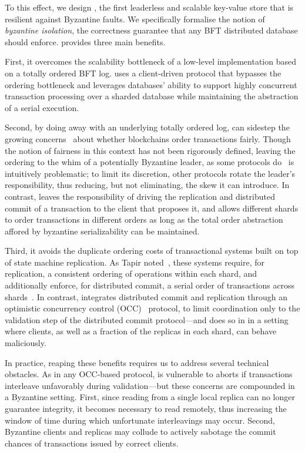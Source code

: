 To this effect, we design \sys{}, the first leaderless and scalable key-value store that is resilient against
Byzantine faults. We specifically formalise the notion of \textit{byzantine isolation}, the correctness
guarantee that any BFT distributed database should enforce.  \sys{} provides three main benefits.

 First, it overcomes the scalability bottleneck of a low-level
implementation based on a totally ordered BFT log. \sys uses a
client-driven protocol that bypasses the ordering bottleneck and
leverages databases' ability to support highly concurrent transaction
processing over a sharded database while maintaining the abstraction
of a serial execution.


Second, by doing away with an underlying totally ordered log, \sys{} can
sidestep the growing concerns~\cite{} about whether blockchains
order transactions fairly. Though the notion of fairness in this
context has not been rigorously defined, leaving the ordering to the
whim of a potentially Byzantine leader, as some protocols do~\cite{}
is intuitively problematic; to limit its discretion, other protocols
rotate the leader's responsibility, thus reducing, but not
eliminating, the skew it can introduce. In contrast, \sys leaves the
responsibility of driving the replication and distributed commit of a
transaction to the client that proposes it, and allows different
shards to order transactions in different orders as
long as the total order abstraction affored by byzantine serializability can be maintained.

Third, it avoids the duplicate ordering costs of transactional systems
built on top of state machine replication. As Tapir noted~\cite{},
these systems require, for replication, a consistent ordering of
operations within each shard, and additionally enforce, for
distributed commit, a serial order of transactions across
shards~\cite{}. In contrast, \sys{} integrates distributed commit and
replication through an optimistic concurrency control (OCC)~\cite{} protocol, to
limit coordination only to the validation step of the distributed commit
protocol---and does so in in a setting where clients, as well as a
fraction of the replicas in each shard, can behave maliciously.

In practice, reaping these benefits requires us to address several
technical obstacles. As in any OCC-based protocol, \sys
is vulnerable to aborts if transactions interleave unfavorably during
validation---but these concerns are compounded in a Byzantine
setting. First, since reading from a single local replica can no
longer guarantee integrity, it becomes necessary to read remotely,
thus increasing the window of time during which unfortunate
interleavings may occur. Second, Byzantine clients and replicas may
collude to actively sabotage the commit chances of transactions issued
by correct clients. 


